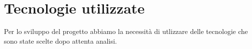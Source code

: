 \section{Tecnologie utilizzate} 
Per lo sviluppo del progetto abbiamo la necessità di utlizzare delle tecnologie che sono state scelte dopo attenta analisi. 
